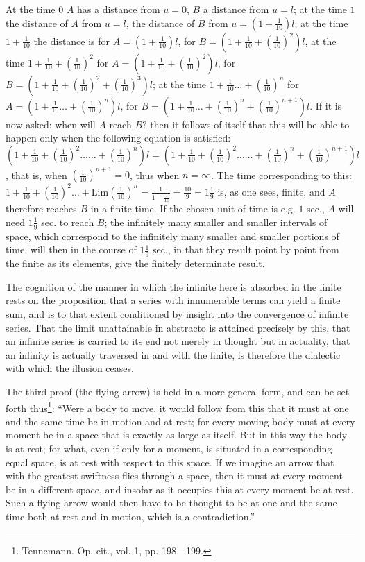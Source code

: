 \documentclass[12pt,a4paper,openany]{book}
\newcommand{\opage}[1]{\marginnote{\footnotesize\textit{[#1]}}}
\begin{document}
At the time $0$ $A$ has a distance from $u=0$, $B$ a distance from $u=l$; at the time $1$ the distance of $A$ from $u=l$, the distance of $B$ from $u=(1+\frac{1}{10})l$; at the time $1+\frac{1}{10}$ the distance is for $A=(1+\frac{1}{10})l$, for $B=(1+\frac{1}{10}+(\frac{1}{10})^{2})l$, at the time $1+\frac{1}{10}+(\frac{1}{10})^{2}$ for $A=(1+\frac{1}{10}+(\frac{1}{10})^{2})l$, for $B=(1+\frac{1}{10}+(\frac{1}{10})^{2}+(\frac{1}{10})^{3})l$; at the time $1+\frac{1}{10}\ldots+(\frac{1}{10})^{n}$ for $A=(1+\frac{1}{10}\ldots+(\frac{1}{10})^{n})l$, for $B=(1+\frac{1}{10}\ldots+(\frac{1}{10})^{n}+(\frac{1}{10})^{n+1})l$. If it is now asked: when will $A$ reach $B$?
then it follows of itself that this will be able to happen only when the following equation is satisfied: $(1+\frac{1}{10}+(\frac{1}{10})^{2}\ldots\ldots+(\frac{1}{10})^{n})l=(1+\frac{1}{10}+(\frac{1}{10})^{2}\ldots\ldots+(\frac{1}{10})^{n}+(\frac{1}{10})^{n+1})l$, that is, when $(\frac{1}{10})^{n+1}=0$, thus when $n=\infty$. %
The time corresponding to this: $1+\frac{1}{10}+(\frac{1}{10})^{2}\ldots+\mathrm{Lim}(\frac{1}{10})^{n}=\frac{1}{1-\frac{1}{10}}=\frac{10}{9}=1\frac{1}{9}$ is, as one sees, finite, and $A$ therefore reaches $B$ in a finite time. If the chosen unit of time is e.g. $1$ sec., $A$ will need $1\frac{1}{9}$ sec. to reach $B$; the infinitely many smaller and smaller intervals of space, which correspond to the infinitely many smaller and smaller portions of time, will then in the course of $1\frac{1}{9}$ sec., in that they result point by point from the finite as its elements, give the finitely determinate result.

The cognition of the manner in which the infinite here is absorbed in the finite rests on the proposition that a series with innumerable terms can yield a finite sum, and is
\setcounter{footnote}{0}%
\opage{137}to that extent conditioned by insight into the convergence of infinite series. That the limit unattainable in abstracto is attained precisely by this, that an infinite series is carried to its end not merely in thought but in actuality, that an infinity is actually traversed in and with the finite, is therefore the dialectic with which the illusion ceases.

The third proof (the flying arrow) is held in a more general form, and can be set forth thus\footnote[1]{Tennemann. Op. cit., vol. 1, pp. 198—199.}: ``Were a body to move, it would follow from this that it must at one and the same time be in motion and at rest; for every moving body must at every moment be in a space that is exactly as large as itself. But in this way the body is at rest; for what, even if only for a moment, is situated in a corresponding equal space, is at rest with respect to this space. If we imagine an arrow that with the greatest swiftness flies through a space, then it must at every moment be in a different space, and insofar as it occupies this at every moment be at rest. Such a flying arrow would then have to be thought to be at one and the same time both at rest and in motion, which is a contradiction.''
\end{document}
